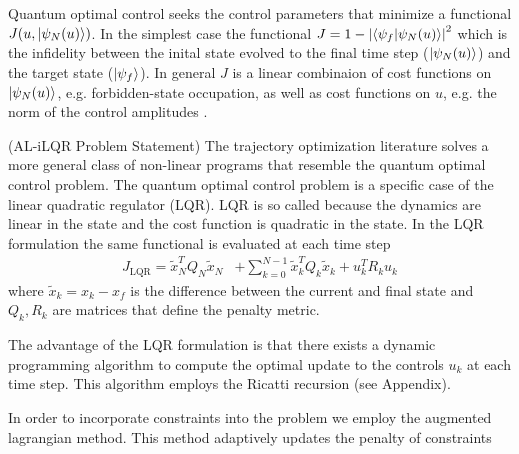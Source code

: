 \documentclass[
  amsfonts,
  amsmath,
  tbtags,
  amssymb,
  aps,
  nobibnotes,
  prl,
  twocolumn,
]{revtex4-2}
\begin{document}
Quantum optimal control seeks the control
parameters that minimize a functional $J(u, \ket{\psi_{N}(u)})$.
In the simplest case the functional
$J = 1 - {\lvert \braket{\psi_{f} \lvert \psi_{N}(u)} \rvert}^{2}$
which is the infidelity between the inital state evolved
to the final time step ($\ket{\psi_{N}(u)}$)
and the target state ($\ket{\psi_{f}}$). In general
$J$ is a linear combinaion of cost functions on $\ket{\psi_{N}(u)}$, e.g.
forbidden-state occupation, as well as
cost functions on $u$, e.g. the norm of the control amplitudes
\cite{leung2017speedup}.

(AL-iLQR Problem Statement) The trajectory optimization
literature solves a more general class of non-linear programs that resemble
the quantum optimal control problem. The quantum optimal control
problem is a specific case of the linear quadratic regulator (LQR).
LQR is so called because the dynamics are linear in the state and
the cost function is quadratic in the state. In the LQR formulation
the same functional is evaluated at each time step
\begin{equation}
  \begin{aligned}
    J_{\textrm{LQR}} = \tilde{x}_{N}^{T} Q_{N} \tilde{x}_{N}
    &+ \sum_{k = 0}^{N - 1} \tilde{x}_{k}^{T} Q_{k} \tilde{x}_{k} + u_{k}^{T} R_{k} u_{k}
  \end{aligned}
\end{equation}
where $\tilde{x}_{k} = x_{k} - x_{f}$ is the difference between the current
and final state and $Q_{k}, R_{k}$ are matrices that define the penalty metric.

The advantage of the LQR formulation
is that there exists a dynamic programming algorithm to compute the
optimal update to the controls $u_{k}$ at each time step.
This algorithm employs the Ricatti recursion (see Appendix).

In order to incorporate constraints into the problem we employ
the augmented lagrangian method. This method adaptively
updates the penalty of constraints
\end{document}
